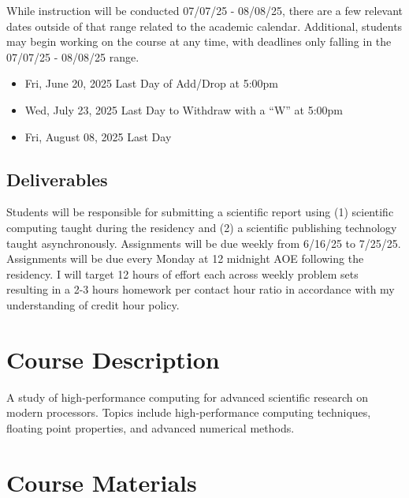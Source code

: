 \documentclass[11pt]{article}
\begin{document}
While instruction will be conducted  07/07/25 - 08/08/25, there are a few relevant dates outside of that range related to the academic calendar. Additional, students may begin working on the course at any time, with deadlines only falling in the  07/07/25 - 08/08/25 range.

\begin{itemize}
	\item Fri, June 20, 2025 Last Day of Add/Drop at 5:00pm
	\item Wed, July 23, 2025 Last Day to Withdraw with a “W” at 5:00pm
	\item Fri, August 08, 2025 Last Day
\end{itemize}

\subsection*{Deliverables} 

Students will be responsible for submitting a scientific report using (1) scientific computing taught during the residency and (2) a scientific publishing technology taught asynchronously. Assignments will be due weekly from 6/16/25 to 7/25/25. Assignments will be due every Monday at 12 midnight AOE following the residency.  I
will target 12 hours of effort each across weekly problem sets resulting in a 2-3 hours homework
per contact hour ratio in accordance with my understanding of credit hour policy.


\section*{Course Description}

A study of high-performance computing for advanced scientific research on modern processors. Topics include high-performance computing techniques, floating point properties, and advanced numerical methods.


\section*{Course Materials}
\end{document}
